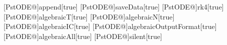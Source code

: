 %
%
[PstODE@]{append}[true]{}%
[PstODE@]{saveData}[true]{}%
[PstODE@]{rk4}[true]{}%
[PstODE@]{algebraicT}[true]{}%
[PstODE@]{algebraicN}[true]{}%
[PstODE@]{algebraicIC}[true]{}%
[PstODE@]{algebraicOutputFormat}[true]{}%
[PstODE@]{algebraicAll}[true]{}%
[PstODE@]{silent}[true]{}%
%
%
\def\pstODEsolve{\def\pst@par{}\pst@object{pstODEsolve}}%
